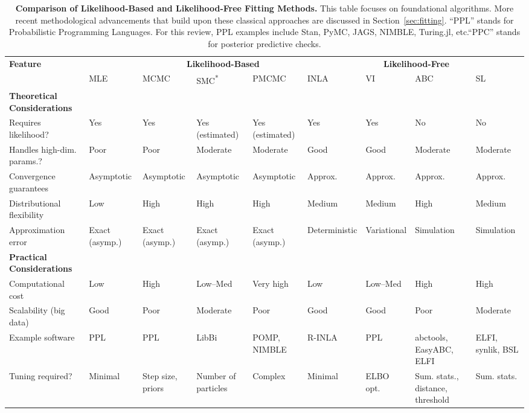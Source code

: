 \documentclass{article}
\begin{document}
\begin{landscape}
\begin{table}[ht]
\renewcommand{\arraystretch}{1.2}
\centering
\caption{\textbf{Comparison of Likelihood-Based and Likelihood-Free Fitting Methods.} 
This table focuses on foundational algorithms. More recent methodological advancements that build upon these classical approaches are discussed in Section~\ref{sec:fitting}. ``PPL'' stands for Probabilistic Programming Languages. For this review, PPL examples include Stan, PyMC, JAGS, NIMBLE, Turing.jl, etc.``PPC'' stands for posterior predictive checks.}
\label{tab:methods_comparison}
\small
\begin{tabular}{@{}p{3.5cm}p{1.5cm}p{1.5cm}p{2.2cm}p{2.2cm}p{1.5cm}p{1.5cm}p{1.5cm}p{1.5cm}@{}}
\toprule
\multirow{2}{*}{\textbf{Feature}} & \multicolumn{5}{c}{\textbf{Likelihood-Based}} & \multicolumn{2}{c}{\textbf{Likelihood-Free}} \\
\cmidrule(lr){2-7} \cmidrule(lr){8-9}
 & \ac{MLE} & \ac{MCMC} & \ac{SMC}\textsuperscript{*}  & \ac{PMCMC} & \ac{INLA} & \ac{VI} & \ac{ABC} & \ac{SL} \\
\midrule
\textbf{Theoretical Considerations} & & & & & & & & \\
\midrule
Requires likelihood? & Yes & Yes  & Yes (estimated) & Yes (estimated) & Yes & Yes & No & No \\
Handles high-dim. params.? & Poor &Poor & Moderate & Moderate & Good & Good & Moderate & Moderate \\
Convergence guarantees & Asymptotic & Asymptotic & Asymptotic & Asymptotic & Approx. & Approx. & Approx. & Approx. \\
Distributional flexibility & Low & High & High & High & Medium & Medium & High & Medium \\
Approximation error & Exact (asymp.) & Exact (asymp.) & Exact (asymp.) & Exact (asymp.)& Deterministic & Variational & Simulation & Simulation \\
\midrule
\textbf{Practical Considerations} & & & & & & & & \\
\midrule
Computational cost & Low & High & Low--Med  & Very high & Low & Low--Med & High & High \\
Scalability (big data) & Good & Poor & Moderate & Poor & Good & Good & Poor & Moderate \\
Example software & PPL & PPL & LibBi  & POMP, NIMBLE & R-INLA & PPL & abctools, EasyABC, ELFI & ELFI, synlik, BSL \\
Tuning required? & Minimal & Step size, priors & Number of particles & Complex & Minimal & ELBO opt. & Sum. stats., distance, threshold & Sum. stats. \\

\end{tabular}
\end{table}
\end{landscape}
\end{document}
